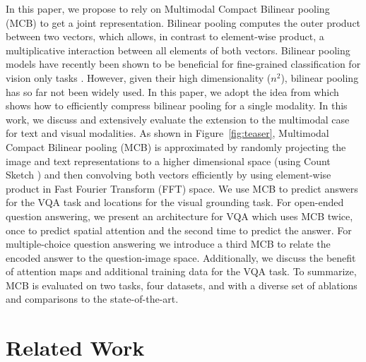 \documentclass[11pt,letterpaper]{article}
\DeclareRobustCommand{\Figref}[1]{Figure~\ref{#1}}
\begin{document}
In this paper, we propose to rely on Multimodal Compact Bilinear pooling (MCB)   to get a joint representation. Bilinear pooling  computes the outer product between two vectors, which allows, in contrast to element-wise product, a multiplicative interaction between all elements of both vectors. Bilinear pooling models \cite{tenenbaum00nc} have  recently been shown to be beneficial for fine-grained classification  for vision only tasks \cite{lin15iccv}. However, given their high dimensionality ($n^2$), bilinear pooling has so far not been widely used. In this paper, we adopt the idea from  which shows how to efficiently compress bilinear pooling for a single modality.
In this work, we discuss and extensively evaluate the extension to the multimodal case for text and visual modalities.
As shown in  \Figref{fig:teaser},  Multimodal Compact  Bilinear pooling (MCB) is approximated by randomly projecting the image and text representations to a higher dimensional space (using Count Sketch \cite{charikar2002countsketch}) and then convolving both vectors efficiently by using element-wise product in Fast Fourier Transform (FFT) space.
We use MCB to predict answers for the VQA task and locations for the visual grounding task. For open-ended question answering, we present an architecture for VQA which uses MCB twice, once to predict spatial attention and the second time to predict the answer. For multiple-choice question answering we introduce a third MCB to relate the encoded answer to the question-image space.
Additionally, we discuss the benefit of attention maps and additional training data for the VQA task.
To summarize, MCB is evaluated on two tasks, four datasets, and with a diverse set of ablations and comparisons to the state-of-the-art.
 
\section{Related Work}
\end{document}
